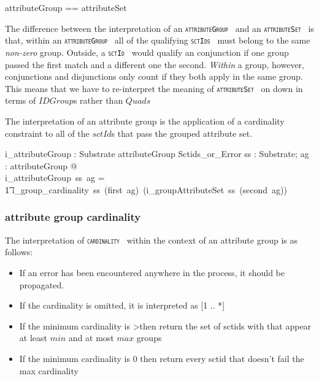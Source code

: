 \documentclass{article}
\def\spec#1{{\tt \small \textsc{{#1}} }}
\begin{document}
\begin{zed}
attributeGroup == \optional[cardinality] \cross attributeSet
\end{zed}

The difference between the interpretation of an \spec{attributeGroup} and an \spec{attributeSet} is that, within an \spec{attributeGroup} all of the 
qualifying \spec{sctIds} must belong to the same \textit{non-zero} group.  Outside, a \spec{sctId} would qualify an conjunction if one group passed the first match
and a different one the second.  \emph{Within} a group, however, conjunctions and disjunctions only count if they both apply in the same group.  This means
that we have to re-interpret the meaning of \spec{attributeSet} on down in terms of $IDGroup$s rather than $Quads$

The interpretation of an attribute group is the application of a cardinality constraint to all of the $sctId$s that pass the grouped 
attribute set.

\begin{gendef}
   i\_attributeGroup : Substrate \fun attributeGroup \fun Sctids\_or\_Error
\where
   \forall ss : Substrate; ag : attributeGroup @ \\
   i\_attributeGroup~ss~ag = \\
   \t1  i\_group\_cardinality~ss~(first~ag)~(i\_groupAttributeSet~ss~(second~ag))
\end{gendef}

\subsubsection{attribute group cardinality}
The interpretation of \spec{cardinality} within the context of an attribute group is as follows:
\begin{itemize}[noitemsep]
\item If an error has been encountered anywhere in the process, it should be propagated.
\item If the cardinality is omitted, it is interpreted as [1 .. *]
\item If the minimum cardinality is \textgreater then return the set of sctids with that appear at least $min$ and at most $max$ groups
\item If the minimum cardinality is 0 then return every sctid that doesn't fail the max cardinality
\end{itemize}
\end{document}
